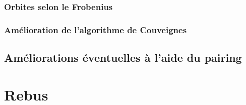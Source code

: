 \documentclass[10pt,a4paper]{book}
\theoremstyle{plain}
\theoremstyle{definition}
\theoremstyle{definition}
\theoremstyle{definition}
\theoremstyle{definition}
\theoremstyle{remark}
\theoremstyle{remark}
\begin{document}
\subsection{Orbites selon le Frobenius}
\subsection{Amélioration de l'algorithme de Couveignes}

\section{Améliorations éventuelles à l'aide du pairing}

\chapter{Rebus}
\end{document}
